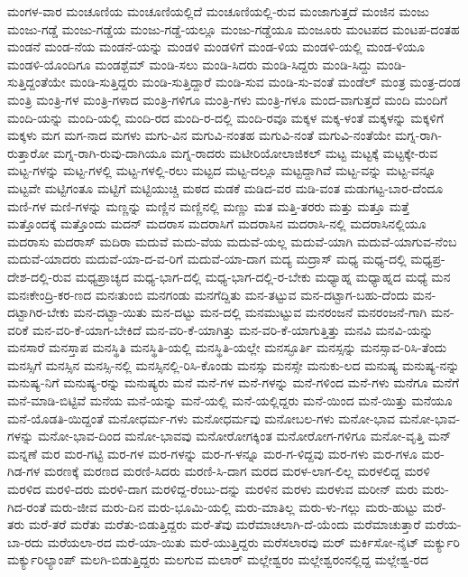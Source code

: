 {ಮಂಗಳ-ವಾರ
ಮಂಚೂಣಿಯ
ಮಂಚೂಣಿಯಲ್ಲಿದೆ
ಮಂಚೂಣಿಯಲ್ಲಿ-ರುವ
ಮಂಜಾಗುತ್ತದೆ
ಮಂಜಿನ
ಮಂಜು
ಮಂಜು-ಗಡ್ಡೆ
ಮಂಜು-ಗಡ್ಡೆಯ
ಮಂಜು-ಗಡ್ಡೆ-ಯಲ್ಲೂ
ಮಂಜು-ಗಡ್ಡೆಯೂ
ಮಂಜೂರು
ಮಂಟಪದ
ಮಂಟಪ-ದಂತಹ
ಮಂಡನೆ
ಮಂಡ-ನೆಯ
ಮಂಡನೆ-ಯನ್ನು
ಮಂಡಳಿ
ಮಂಡಳಿಗೆ
ಮಂಡ-ಳಿಯ
ಮಂಡಳಿ-ಯಲ್ಲಿ
ಮಂಡ-ಳಿಯೂ
ಮಂಡಳಿ-ಯೊಂದಿಗೂ
ಮಂಡಶ್ಬೆಮ್
ಮಂಡಿ-ಸಲು
ಮಂಡಿ-ಸಿದರು
ಮಂಡಿ-ಸಿದ್ದರು
ಮಂಡಿ-ಸಿದ್ದು
ಮಂಡಿ-ಸುತ್ತಿದ್ದಂತೆಯೇ
ಮಂಡಿ-ಸುತ್ತಿದ್ದರು
ಮಂಡಿ-ಸುತ್ತಿದ್ದಾರೆ
ಮಂಡಿ-ಸುವ
ಮಂಡಿ-ಸು-ವಂತೆ
ಮಂಡೆಲ್
ಮಂತ್ರ
ಮಂತ್ರ-ದಂಡ
ಮಂತ್ರಿ
ಮಂತ್ರಿ-ಗಳ
ಮಂತ್ರಿ-ಗಳಾದ
ಮಂತ್ರಿ-ಗಳಿಗೂ
ಮಂತ್ರಿ-ಗಳು
ಮಂತ್ರಿ-ಗಳೂ
ಮಂದ-ವಾಗುತ್ತದೆ
ಮಂದಿ
ಮಂದಿಗೆ
ಮಂದಿ-ಯನ್ನು
ಮಂದಿ-ಯಲ್ಲಿ
ಮಂದಿ-ರದ
ಮಂದಿ-ರ-ದಲ್ಲಿ
ಮಂದಿ-ರವೂ
ಮಕ್ಕಳ
ಮಕ್ಕ-ಳಂತೆ
ಮಕ್ಕಳನ್ನು
ಮಕ್ಕಳಿಗೆ
ಮಕ್ಕಳು
ಮಗ
ಮಗ-ನಾದ
ಮಗಳು
ಮಗು-ವಿನ
ಮಗುವಿ-ನಂತಹ
ಮಗುವಿ-ನಂತೆ
ಮಗುವಿ-ನಂತೆಯೇ
ಮಗ್ನ-ರಾಗಿ-ರುತ್ತಾರೋ
ಮಗ್ನ-ರಾಗಿ-ರುವು-ದಾಗಿಯೂ
ಮಗ್ನ-ರಾದರು
ಮಟೀರಿಯೋಲಾಜಿಕಲ್
ಮಟ್ಟ
ಮಟ್ಟಕ್ಕೆ
ಮಟ್ಟಕ್ಕೇ-ರುವ
ಮಟ್ಟ-ಗಳನ್ನು
ಮಟ್ಟ-ಗಳಲ್ಲಿ
ಮಟ್ಟ-ಗಳಲ್ಲಿ-ರಲು
ಮಟ್ಟದ
ಮಟ್ಟ-ದಲ್ಲೂ
ಮಟ್ಟದ್ದಾಗಿವೆ
ಮಟ್ಟ-ವನ್ನು
ಮಟ್ಟ-ವನ್ನೂ
ಮಟ್ಟವೇ
ಮಟ್ಟಿಗಂತೂ
ಮಟ್ಟಿಗೆ
ಮಟ್ಟಿಯುಚ್ಚಿ
ಮಠದ
ಮಡಕೆ
ಮಡಿದ-ವರ
ಮಡಿ-ವಂತ
ಮಡುಗಟ್ಟ-ಬಾರ-ದೆಂದೂ
ಮಣಿ-ಗಳ
ಮಣಿ-ಗಳನ್ನು
ಮಣ್ಣನ್ನು
ಮಣ್ಣಿನ
ಮಣ್ಣಿನಲ್ಲಿ
ಮಣ್ಣು
ಮತ
ಮತ್ತಿ-ತರರು
ಮತ್ತು
ಮತ್ತೂ
ಮತ್ತೆ
ಮತ್ತೊಂದಕ್ಕೆ
ಮತ್ತೊಂದು
ಮದನ್
ಮದರಾಸ
ಮದರಾಸಿಗೆ
ಮದರಾಸಿನ
ಮದರಾಸಿ-ನಲ್ಲಿ
ಮದರಾಸಿನಲ್ಲಿಯೂ
ಮದರಾಸು
ಮದರಾಸ್
ಮದಿರಾ
ಮದುವೆ
ಮದು-ವೆಯ
ಮದುವೆ-ಯಲ್ಲ
ಮದುವೆ-ಯಾಗಿ
ಮದುವೆ-ಯಾಗುವ-ನೆಂಬ
ಮದುವೆ-ಯಾದರು
ಮದುವೆ-ಯಾ-ದ-ವ-ರಿಗೆ
ಮದುವೆ-ಯಾ-ದಾಗ
ಮದ್ಯ
ಮದ್ರಾಸ್
ಮಧ್ಯ
ಮಧ್ಯ-ದಲ್ಲಿ
ಮಧ್ಯಪ್ರ-ದೇಶ-ದಲ್ಲಿ-ರುವ
ಮಧ್ಯಪ್ರಾಚ್ಯದ
ಮಧ್ಯ-ಭಾಗ-ದಲ್ಲಿ
ಮಧ್ಯ-ಭಾಗ-ದಲ್ಲಿ-ರ-ಬೇಕು
ಮಧ್ಯಾಹ್ನ
ಮಧ್ಯಾಹ್ನದ
ಮಧ್ಯೆ
ಮನ
ಮನಃಕೇಂದ್ರಿ-ಕರ-ಣದ
ಮನಃತುಂಬಿ
ಮನಗಂಡು
ಮನಗೆದ್ದಿತು
ಮನ-ತಟ್ಟುವ
ಮನ-ದಟ್ಟಾಗ-ಬಹು-ದೆಂದು
ಮನ-ದಟ್ಟಾಗಿರ-ಬೇಕು
ಮನ-ದಟ್ಟಾ-ಯಿತು
ಮನ-ದಟ್ಟು
ಮನ-ದಲ್ಲಿ
ಮನಮುಟ್ಟುವ
ಮನರಂಜನೆ
ಮನರಂಜನೆ-ಗಾಗಿ
ಮನ-ವರಿಕೆ
ಮನ-ವರಿ-ಕೆ-ಯಾಗ-ಬೇಕಿದೆ
ಮನ-ವರಿ-ಕೆ-ಯಾಗಿತ್ತು
ಮನ-ವರಿ-ಕೆ-ಯಾಗುತ್ತಿತ್ತು
ಮನವಿ
ಮನವಿ-ಯನ್ನು
ಮನಸಾರೆ
ಮನಸ್ತಾಪ
ಮನಸ್ಥಿತಿ
ಮನಸ್ಥಿತಿ-ಯಲ್ಲಿ
ಮನಸ್ಥಿತಿ-ಯಲ್ಲೇ
ಮನಸ್ಫೂರ್ತಿ
ಮನಸ್ಸನ್ನು
ಮನಸ್ಸಾವ-ರಿಸಿ-ತೆಂದು
ಮನಸ್ಸಿಗೆ
ಮನಸ್ಸಿನ
ಮನಸ್ಸಿ-ನಲ್ಲಿ
ಮನಸ್ಸಿನಲ್ಲಿ-ರಿಸಿ-ಕೊಂಡು
ಮನಸ್ಸು
ಮನಸ್ಸೇ
ಮನುಕು-ಲದ
ಮನುಷ್ಯ
ಮನುಷ್ಯ-ನನ್ನು
ಮನುಷ್ಯ-ನಿಗೆ
ಮನುಷ್ಯ-ರನ್ನು
ಮನುಷ್ಯರು
ಮನೆ
ಮನೆ-ಗಳ
ಮನೆ-ಗಳನ್ನು
ಮನೆ-ಗಳಿಂದ
ಮನೆ-ಗಳು
ಮನೆಗೂ
ಮನೆಗೆ
ಮನೆ-ಮಾಡಿ-ಬಿಟ್ಟಿವೆ
ಮನೆಯ
ಮನೆ-ಯನ್ನು
ಮನೆ-ಯಲ್ಲಿ
ಮನೆ-ಯಲ್ಲಿದ್ದರು
ಮನೆ-ಯಿಂದ
ಮನೆ-ಯಿತ್ತು
ಮನೆಯೂ
ಮನೆ-ಯೊಡತಿ-ಯಿದ್ದಂತೆ
ಮನೋಧರ್ಮ-ಗಳು
ಮನೋಧರ್ಮವು
ಮನೋಬಲ-ಗಳು
ಮನೋ-ಭಾವ
ಮನೋ-ಭಾವ-ಗಳನ್ನು
ಮನೋ-ಭಾವ-ದಿಂದ
ಮನೋ-ಭಾವವು
ಮನೋರೋಗಕ್ಕಿಂತ
ಮನೋರೋಗ-ಗಳಿಗೂ
ಮನೋ-ವೃತ್ತಿ
ಮನ್
ಮನ್ನಣೆ
ಮರ
ಮರ-ಗಟ್ಟಿ
ಮರ-ಗಳ
ಮರ-ಗಳನ್ನು
ಮರ-ಗ-ಳನ್ನೂ
ಮರ-ಗ-ಳಿದ್ದವು
ಮರ-ಗಳು
ಮರ-ಗಳೂ
ಮರ-ಗಿಡ-ಗಳ
ಮರಣಕ್ಕೆ
ಮರಣದ
ಮರಣಿ-ಸಿದರು
ಮರಣಿ-ಸಿ-ದಾಗ
ಮರದ
ಮರಳ-ಲಾಗ-ಲಿಲ್ಲ
ಮರಳಲಿದ್ದ
ಮರಳಿ
ಮರಳಿದ
ಮರಳಿ-ದರು
ಮರಳಿ-ದಾಗ
ಮರಳಿದ್ದ-ರೆಂಬು-ದನ್ನು
ಮರಳಿನ
ಮರಳು
ಮರಳುವ
ಮರೀನ್
ಮರು
ಮರು-ಗಿದ-ರಂತೆ
ಮರು-ಜೀವ
ಮರು-ದಿನ
ಮರು-ಭೂಮಿ-ಯಲ್ಲಿ
ಮರು-ಮಾತಿಲ್ಲ
ಮರು-ಳು-ಗಲ್ಲು
ಮರು-ಹುಟ್ಟು
ಮರೆ-ತರು
ಮರೆ-ತರೆ
ಮರೆತು
ಮರೆತು-ಬಿಡುತ್ತಿದ್ದರು
ಮರೆ-ತೆವು
ಮರೆಮಾಚಲಾಗಿ-ದೆ-ಯೆಂದು
ಮರೆಮಾಚುತ್ತಾರೆ
ಮರೆಯ-ಬಾ-ರದು
ಮರೆಯಲಾ-ರದ
ಮರೆ-ಯಾ-ಯಿತು
ಮರೆ-ಯುತ್ತಿದ್ದರು
ಮರೆಸಲಾರವು
ಮರ್
ಮರ್ಕಿಸೋ-ನೈಟ್
ಮರ್ಕ್ಯುರಿ
ಮರ್ಕ್ಯುರಿಲ್ಯಾಂಪ್
ಮಲಗಿ-ಬಿಡುತ್ತಿದ್ದರು
ಮಲಗುವ
ಮಲಾರ್
ಮಲ್ಲೇಶ್ವರಂ
ಮಲ್ಲೇಶ್ವರಂನಲ್ಲಿದ್ದ
ಮಲ್ಲೇಶ್ವ-ರದ
}
